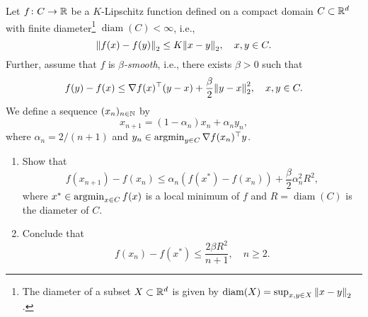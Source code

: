 \begin{exercise}
Let $f \colon C \to \mathbb{R}$ be a $K$-Lipschitz function defined on a compact domain $C \subset \mathbb{R}^d$ with finite diameter\footnote{The diameter of a subset $X \subset \mathbb{R}^d$ is given by $\operatorname{diam}(X) = \sup_{x, y \in X} \norm{x - y}_2$.} $\operatorname{diam}(C) < \infty$, i.e.,
\[
    \norm{f(x) - f(y)}_2 \leq K \norm{x - y}_2, \quad x, y \in C.
\]
Further, assume that $f$ is \emph{$\beta$-smooth}, i.e., there exists $\beta > 0$ such that
\[
    f(y) - f(x) \leq \nabla f(x)^{\top} (y - x) + \frac{\beta}{2} \norm{y - x}_2^2, \quad x, y \in C.
\]
We define a sequence $(x_n)_{n \in \mathbb{N}}$ by
\[
    x_{n+1} = (1 - \alpha_n)x_n + \alpha_n y_n,
\]
where $\alpha_n = 2 / (n+1)$ and $y_n \in \operatorname*{argmin}_{y \in C} \nabla f(x_n)^{\top} y$.
\begin{enumerate}
    \item Show that
            \[
                f(x_{n+1}) - f(x_n) \leq \alpha_n (f(x^*) - f(x_n)) + \frac{\beta}{2} \alpha_n^2 R^2,
            \]
        where $x^{*} \in \operatorname*{argmin}_{x \in C} f(x)$ is a local minimum of $f$ and $R = \operatorname{diam}(C)$ is the diameter of $C$.

    \item Conclude that
            \[
                f(x_n) - f(x^*) \leq \frac{2 \beta R^2}{n + 1}, \quad n \geq 2.
            \]
\end{enumerate}
\end{exercise}
